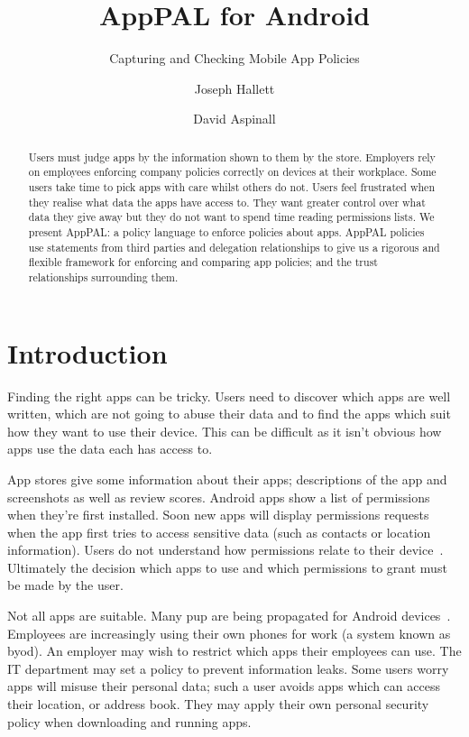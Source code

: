 \documentclass[]{llncs}
\title{AppPAL for Android}
\subtitle{Capturing and Checking Mobile App Policies}
\author{Joseph Hallett \and David Aspinall }
\institute{University of Edinburgh}
\newcommand{\comment}[1]{}%
\begin{document}
\maketitle{}

\begin{abstract}
  Users must judge apps by the information shown to them by the store.
  Employers rely on employees enforcing company policies correctly on devices at their workplace.
  Some users take time to pick apps with care whilst others do not.
  Users feel frustrated when they realise what data the apps have access to.
  They want greater control over what data they give away but they do not want to spend time reading permissions lists.
  We present AppPAL: a policy language to enforce policies about apps.
  AppPAL policies use statements from third parties and delegation relationships to give us a rigorous and flexible framework for enforcing and comparing app policies; and the trust relationships surrounding them.
\end{abstract}

\section{Introduction \comment{1 page}}
\label{sec:introduction}

Finding the right apps can be tricky.
Users need to discover which apps are well written, which are not going to abuse their data
  and to find the apps which suit how they want to use their device.
This can be difficult as it isn't obvious how apps use the data each has access to.

App stores give some information about their apps; descriptions of the app and screenshots as well as review scores.
Android apps show a list of permissions when they're first installed.
Soon new apps will display permissions requests when the app first tries to access sensitive data (such as contacts or location information).
Users do not understand how permissions relate to their device~\cite{Felt:2012hm,Thompson:2013eb}.
Ultimately the decision which apps to use and which permissions to grant must be made by the user.

Not all apps are suitable.
Many \ac{pup} are being propagated for Android devices~\cite{Truong:2014bi,Svajcer:2013tp}.
Employees are increasingly using their own phones for work (a system known as \ac{byod}).
An employer may wish to restrict which apps their employees can use.
The IT department may set a policy to prevent information leaks.
Some users worry apps will misuse their personal data;
  such a user avoids apps which can access their location, or address book.
They may apply their own personal security policy when downloading and running apps.
\end{document}
